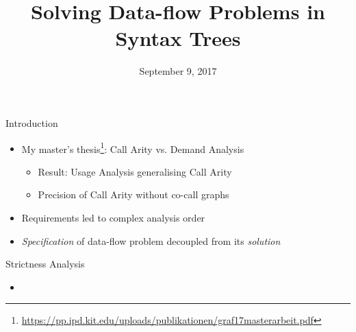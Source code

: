 \documentclass{haskellbeamer}
\title{Solving Data-flow Problems in Syntax Trees}
\date{September 9, 2017}
\begin{document}
  \maketitle

  \begin{frame}{Introduction}
    \begin{itemize}
      \item My master's thesis\footnote{\tiny\url{https://pp.ipd.kit.edu/uploads/publikationen/graf17masterarbeit.pdf}}: Call Arity vs. Demand Analysis
        \begin{itemize}
          \item Result: Usage Analysis generalising Call Arity
          \item Precision of Call Arity without co-call graphs
        \end{itemize}
      \item Requirements led to complex analysis order
      \item \emph{Specification} of data-flow problem decoupled from its \emph{solution}
    \end{itemize}
  \end{frame}

  \begin{frame}{Strictness Analysis}
    \begin{itemize}
      \item {}
    \end{itemize}
  \end{frame}
\end{document}
